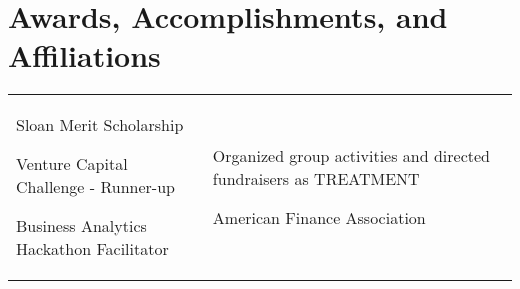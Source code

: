 \documentclass[a4paper,10pt]{article}
\begin{document}
\smallskip
\section{Awards, Accomplishments, and Affiliations}
\begin{supertabular}{p{8.65cm} p{8.65cm}}

	\begin{enumerate*}[label =$\circ$, itemjoin={\newline}]
		\item \small Sloan Merit Scholarship
		\item \small Venture Capital Challenge - Runner-up
		\item \small Business Analytics Hackathon Facilitator
		\end{enumerate*}


	& \begin{enumerate*}[label =$\circ$, itemjoin={\newline}]
                                \item \small Organized group activities and directed fundraisers as TREATMENT
                                \item \small American Finance Association
                                \end{enumerate*}  \vspace{1mm} \\



\end{supertabular}




\smallskip
\end{document}
